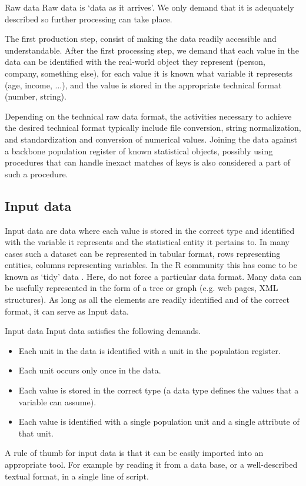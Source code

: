 \begin{terminology}{Raw data}
Raw data is `data as it arrives'. We only demand that it is adequately
described so further processing can take place.
\end{terminology}

The first production step, consist of making the data readily accessible and
understandable. After the first processing step, we demand that each value in
the data can be identified with the real-world object they represent (person,
company, something else), for each value it is known what variable it
represents (age, income, ...), and the value is stored in the appropriate
technical format (number, string).

Depending on the technical raw data format, the activities necessary to achieve
the desired technical format typically include file conversion, string
normalization, and standardization and conversion of numerical values. Joining
the data against a backbone population register of known statistical objects,
possibly using procedures that can handle inexact matches of keys is also
considered a part of such a procedure. 


\subsection*{Input data}
Input data are data where each value is stored in the correct type and
identified with the variable it represents and the statistical entity it
pertains to. In many cases such a dataset can be represented in tabular format,
rows representing entities, columns representing variables.  In the R community
this has come to be known as `tidy' data \citep{wickham2014tidy}.  Here, do not
force a particular data format. Many data can be usefully represented in the
form of a tree or graph (e.g. web pages, XML structures). As long as all the
elements are readily identified and of the correct format, it can serve as
Input data.

\begin{terminology}{Input data}
Input data satisfies the following demands.
\begin{itemize}
\item Each unit in the data is identified with a unit in the population register.
\item Each unit occurs only once in the data.
\item Each value is stored in the correct type (a data type defines the values
      that a variable can assume).
\item Each value is identified with a single population unit and a single attribute of that unit.
\end{itemize}
\end{terminology}
A rule of thumb for input data is that it can be easily imported into an
appropriate tool. For example by reading it from a data base, or a
well-described textual format, in a single line of script.


